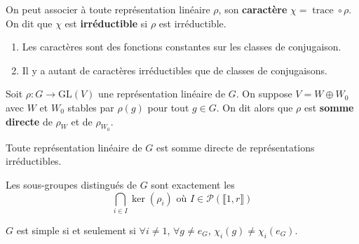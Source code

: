   \begin{definition}
    On peut associer à toute représentation linéaire $\rho$, son \textbf{caractère} $\chi = \operatorname{trace} \circ \rho$. On dit que $\chi$ est \textbf{irréductible} si $\rho$ est irréductible.
  \end{definition}

  \begin{proposition}
    \begin{enumerate}[label=(\roman*)]
      \item Les caractères sont des fonctions constantes sur les classes de conjugaison.
      \item Il y a autant de caractères irréductibles que de classes de conjugaisons.
    \end{enumerate}
  \end{proposition}

  \begin{definition}
    Soit $\rho : G \rightarrow \mathrm{GL}(V)$ une représentation linéaire de $G$. On suppose $V = W \oplus W_0$ avec $W$ et $W_0$ stables par $\rho(g)$ pour tout $g \in G$. On dit alors que $\rho$ est \textbf{somme directe} de $\rho_W$ et de $\rho_{W_0}$.
  \end{definition}

  \begin{theorem}[Maschke]
    Toute représentation linéaire de $G$ est somme directe de représentations irréductibles.
  \end{theorem}


  \begin{theorem}
    Les sous-groupes distingués de $G$ sont exactement les
    \[ \bigcap_{i \in I} \ker(\rho_i) \text{ où } I \in \mathcal{P}(\llbracket 1, r \rrbracket) \]
  \end{theorem}

  \begin{corollary}
    $G$ est simple si et seulement si $\forall i \neq 1$, $\forall g \neq e_G$, $\chi_i(g) \neq \chi_i(e_G)$.
  \end{corollary}

